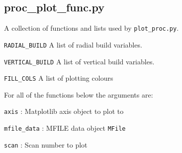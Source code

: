 \documentclass[11pt,a4paper]{report}
\begin{document}
\subsection{proc\_plot\_func.py}

A collection of functions and lists used by \texttt{plot\_proc.py}.

\begin{description}

\item{\verb|RADIAL_BUILD|} A list of radial build variables.

\item{\verb|VERTICAL_BUILD|} A list of vertical build variables.

\item{\verb|FILL_COLS|} A list of plotting colours

\end{description}

For all of the functions below the arguments are:

\hspace{1cm} \texttt{axis} : Matplotlib axis object to plot to

\hspace{1cm} \texttt{mfile\_data} : MFILE data object \verb|MFile|

\hspace{1cm} \texttt{scan} : Scan number to plot
\end{document}
